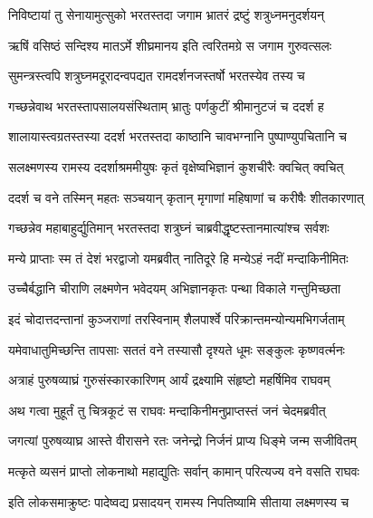 
\twolineshloka
{निविष्टायां तु सेनायामुत्सुको भरतस्तदा}
{जगाम भ्रातरं द्रष्टुं शत्रुध्नमनुदर्शयन्} %

\twolineshloka
{ऋषिं वसिष्ठं सन्दिश्य मातऽर्मे शीघ्रमानय}
{इति त्वरितमग्रे स जगाम गुरुवत्सलः} %

\twolineshloka
{सुमन्त्रस्त्वपि शत्रुघ्नमदूरादन्वपद्यत}
{रामदर्शनजस्तर्षो भरतस्येव तस्य च} %

\twolineshloka
{गच्छन्नेवाथ भरतस्तापसालयसंस्थिताम्}
{भ्रातुः पर्णकुटीं श्रीमानुटजं च ददर्श ह} %

\twolineshloka
{शालायास्त्वग्रतस्तस्या ददर्श भरतस्तदा}
{काष्ठानि चावभग्नानि पुष्पाण्युपचितानि च} %

\twolineshloka
{सलक्ष्मणस्य रामस्य ददर्शाश्रममीयुषः}
{कृतं वृक्षेष्वभिज्ञानं कुशचीरैः क्वचित् क्वचित्} %

\twolineshloka
{ददर्श च वने तस्मिन् महतः सञ्चयान् कृतान्}
{मृगाणां महिषाणां च करीषैः शीतकारणात्} %

\twolineshloka
{गच्छन्नेव महाबाहुर्द्युतिमान् भरतस्तदा}
{शत्रुघ्नं चाब्रवीद्धृष्टस्तानमात्यांश्च सर्वशः} %

\twolineshloka
{मन्ये प्राप्ताः स्म तं देशं भरद्वाजो यमब्रवीत्}
{नातिदूरे हि मन्येऽहं नदीं मन्दाकिनीमितः} %

\twolineshloka
{उच्चैर्बद्धानि चीराणि लक्ष्मणेन भवेदयम्}
{अभिज्ञानकृतः पन्था विकाले गन्तुमिच्छता} %

\twolineshloka
{इदं चोदात्तदन्तानां कुञ्जराणां तरस्विनाम्}
{शैलपार्श्वे परिक्रान्तमन्योन्यमभिगर्जताम्} %

\twolineshloka
{यमेवाधातुमिच्छन्ति तापसाः सततं वने}
{तस्यासौ दृश्यते धूमः सङ्कुलः कृष्णवर्त्मनः} %

\twolineshloka
{अत्राहं पुरुषव्याघ्रं गुरुसंस्कारकारिणम्}
{आर्यं द्रक्ष्यामि संहृष्टो महर्षिमिव राघवम्} %

\twolineshloka
{अथ गत्वा मुहूर्तं तु चित्रकूटं स राघवः}
{मन्दाकिनीमनुप्राप्तस्तं जनं चेदमब्रवीत्} %

\twolineshloka
{जगत्यां पुरुषव्याघ्र आस्ते वीरासने रतः}
{जनेन्द्रो निर्जनं प्राप्य धिङ्मे जन्म सजीवितम्} %

\twolineshloka
{मत्कृते व्यसनं प्राप्तो लोकनाथो महाद्युतिः}
{सर्वान् कामान् परित्यज्य वने वसति राघवः} %

\twolineshloka
{इति लोकसमाक्रुष्टः पादेष्वद्य प्रसादयन्}
{रामस्य निपतिष्यामि सीताया लक्ष्मणस्य च} %

